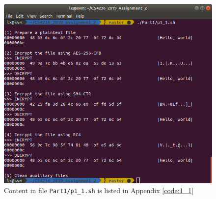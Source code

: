 \begin{figure}[t!]
\centering
\includegraphics[width=\columnwidth]{pictures/p1_1.png}
\caption{
    Content in file \texttt{Part1/p1\_1.sh} is listed in Appendix \ref{code:1_1}
}
\label{fig:p1_1}
\end{figure}

